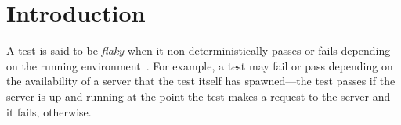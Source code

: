 \documentclass[conference]{IEEEtran}
\begin{document}



\section{Introduction}
\label{sec:intro}

A test is said to be \emph{flaky} when it non-deterministically passes or fails depending on the running environment~\cite{john-mico-google2016}. For example, a test may fail or pass depending on the availability of a server that the test itself has spawned---the test passes if the server is up-and-running at the point the test makes a request to the server and it fails, otherwise. 
\end{document}
